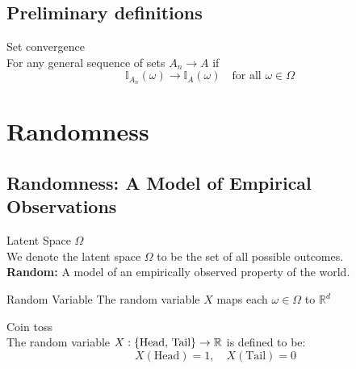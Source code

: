 \newpage
\subsection*{Preliminary definitions}
\begin{df}{Set convergence}\\
For any general sequence of sets $A_n \to A$ if
\[
\mathbb{I}_{A_n}(\omega) \to \mathbb{I}_A(\omega) \quad \text{for all } \omega\in \Omega
\]
\end{df}

%




\newpage
\section{Randomness}

\subsection{Randomness: A Model of Empirical Observations}
\begin{df}{Latent Space $\Omega$}\\
	We denote the latent space $\Omega$ to be the set of all possible outcomes. \\
	\textbf{Random:} A model of an empirically observed property of the world.
\end{df}

\begin{df}{Random Variable}
The random variable $X$ maps each $\omega \in \Omega$ to $\mathbb{R}^d$
\end{df}

\begin{eg}{Coin toss}\\
The random variable $X: \qty{\text{Head, Tail}} \rightarrow {\mathbb{R}}$ is defined to be: 
$$\quad X(\text{Head}) = 1, \quad X(\text{Tail}) = 0$$
\end{eg}

